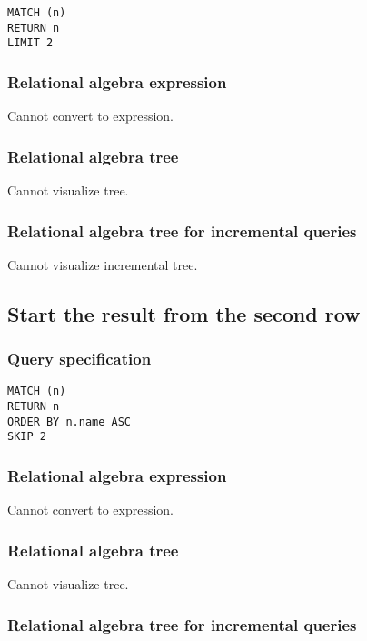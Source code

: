 \begin{lstlisting}
MATCH (n)
RETURN n
LIMIT 2
\end{lstlisting}

\subsubsection*{Relational algebra expression}

Cannot convert to expression.

\subsubsection*{Relational algebra tree}

Cannot visualize tree.

\subsubsection*{Relational algebra tree for incremental queries}

Cannot visualize incremental tree.

\subsection{Start the result from the second row}

\subsubsection*{Query specification}

\begin{lstlisting}
MATCH (n)
RETURN n
ORDER BY n.name ASC
SKIP 2
\end{lstlisting}

\subsubsection*{Relational algebra expression}

Cannot convert to expression.

\subsubsection*{Relational algebra tree}

Cannot visualize tree.

\subsubsection*{Relational algebra tree for incremental queries}

